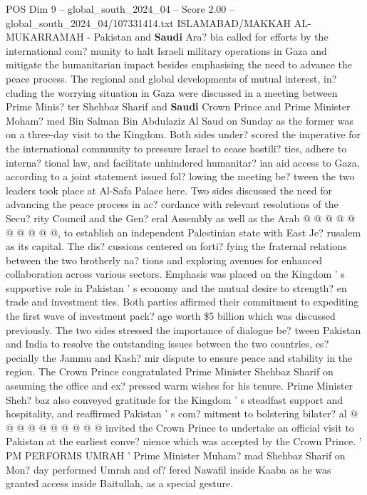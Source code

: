 \begin{textsample}{POS Dim 9 – global\_south\_2024\_04 – Score 2.00 – global\_south\_2024\_04/107331414.txt}  \label{ex:f9_pos_117}
ISLAMABAD/MAKKAH AL-MUKARRAMAH - Pakistan and \textbf{Saudi} Ara? bia called for efforts by the international com? munity to halt Israeli military operations in Gaza and mitigate the humanitarian impact besides emphasising the need to advance the peace process.
The regional and global developments of mutual interest, in? cluding the worrying situation in Gaza were discussed in a meeting between Prime Minis? ter Shehbaz Sharif and \textbf{Saudi} Crown Prince and Prime Minister Moham? med Bin Salman Bin Abdulaziz Al Saud on Sunday as the former was on a three-day visit to the Kingdom.
Both sides under? scored the imperative for the international community to pressure Israel to cease hostili? ties, adhere to interna? tional law, and facilitate unhindered humanitar? ian aid access to Gaza, according to a joint statement issued fol? lowing the meeting be? tween the two leaders took place at Al-Safa Palace here.
Two sides discussed the need for advancing the peace process in ac? cordance with relevant resolutions of the Secu? rity Council and the Gen? eral Assembly as well as the Arab @ @ @ @ @ @ @ @ @ @, to establish an independent Palestinian state with East Je? rusalem as its capital.
The dis? cussions centered on forti? fying the fraternal relations between the two brotherly na? tions and exploring avenues for enhanced collaboration across various sectors.
Emphasis was placed on the Kingdom ' s supportive role in Pakistan ' s economy and the mutual desire to strength? en trade and investment ties.
Both parties affirmed their commitment to expediting the first wave of investment pack? age worth \$5 billion which was discussed previously.
The two sides stressed the importance of dialogue be? tween Pakistan and India to resolve the outstanding issues between the two countries, es? pecially the Jammu and Kash? mir dispute to ensure peace and stability in the region.
The Crown Prince congratulated Prime Minister Shehbaz Sharif on assuming the office and ex? pressed warm wishes for his tenure.
Prime Minister Sheh? baz also conveyed gratitude for the Kingdom ' s steadfast support and hospitality, and reaffirmed Pakistan ' s com? mitment to bolstering bilater? al @ @ @ @ @ @ @ @ @ @ invited the Crown Prince to undertake an official visit to Pakistan at the earliest conve? nience which was accepted by the Crown Prince. ' PM PERFORMS UMRAH ' Prime Minister Muham? mad Shehbaz Sharif on Mon? day performed Umrah and of? fered Nawafil inside Kaaba as he was granted access inside Baitullah, as a special gesture.

\end{textsample}
